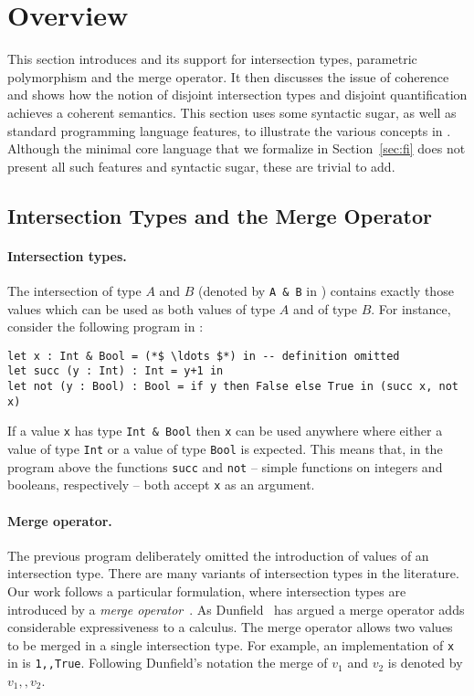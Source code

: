 \section{Overview} \label{sec:overview}

This section introduces \name and its support for intersection types,
parametric polymorphism and the merge operator. 
It then discusses the issue of coherence and shows how the notion of disjoint
intersection types and disjoint quantification achieves a coherent semantics.
This section uses some syntactic sugar, as well as standard
programming language features, to illustrate the various concepts in \name. 
Although the minimal core language that we formalize in
Section~\ref{sec:fi} does not present all such features and syntactic sugar, 
these are trivial to add.

\subsection{Intersection Types and the Merge Operator}

\paragraph{Intersection types.}
The intersection of type $A$ and $B$ (denoted by \lstinline{A & B} in
\name) contains exactly those values
which can be used as both values of type $A$ and of type $B$. 
For instance, consider the following program in \name:

\begin{lstlisting}
let x : Int & Bool = (*$ \ldots $*) in -- definition omitted
let succ (y : Int) : Int = y+1 in
let not (y : Bool) : Bool = if y then False else True in (succ x, not x)
\end{lstlisting}

\noindent If a value \lstinline{x} has type \lstinline{Int & Bool} then
\lstinline{x} can be used anywhere where either a value of type \lstinline{Int} or  
a value of type \lstinline{Bool} is expected. 
This means that, in the program above
the functions \lstinline{succ} and \lstinline{not} -- simple functions 
on integers and booleans, respectively -- both accept \lstinline{x} as an argument. 

\paragraph{Merge operator.}
The previous program deliberately omitted the introduction of values of an
intersection type. 
There are many variants of intersection types in the literature. 
Our work follows a particular
formulation, where
intersection types are introduced by a \emph{merge operator}~\cite{reynolds1997design,reynolds1991coherence,castagna1995calculus,dunfield2014elaborating,oliveira16disjoint}. 
As Dunfield~\cite{dunfield2014elaborating} has argued a merge operator adds considerable
expressiveness to a calculus. 
The merge operator allows two values to be merged in a single intersection type. 
For example, an implementation of \lstinline{x} in \name is \lstinline{1,,True}.
Following Dunfield's notation the merge of $v_1$ and $v_2$ is denoted by $v_1 ,, v_2$.

